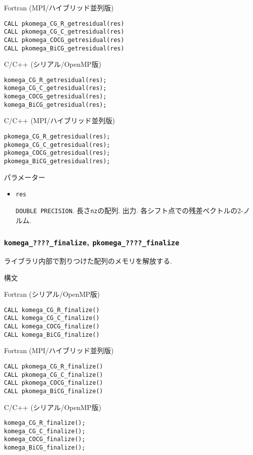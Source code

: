 \documentclass[12pt,titlepage]{jarticle}
\begin{document}
\noindent Fortran (MPI/ハイブリッド並列版)
\begin{verbatim}
CALL pkomega_CG_R_getresidual(res)
CALL pkomega_CG_C_getresidual(res)
CALL pkomega_COCG_getresidual(res)
CALL pkomega_BiCG_getresidual(res)
\end{verbatim}

\noindent C/C++ (シリアル/OpenMP版)
\begin{verbatim}
komega_CG_R_getresidual(res);
komega_CG_C_getresidual(res);
komega_COCG_getresidual(res);
komega_BiCG_getresidual(res);
\end{verbatim}

\noindent C/C++ (MPI/ハイブリッド並列版)
\begin{verbatim}
pkomega_CG_R_getresidual(res);
pkomega_CG_C_getresidual(res);
pkomega_COCG_getresidual(res);
pkomega_BiCG_getresidual(res);
\end{verbatim}

\noindent パラメーター

\begin{itemize}
  
\item \verb|res|

  \verb|DOUBLE PRECISION|.
  長さ\verb|nz|の配列. 出力.
  各シフト点での残差ベクトルの2-ノルム.

\end{itemize}

\subsubsection{\texttt{komega\_????\_finalize}, \texttt{pkomega\_????\_finalize}}

ライブラリ内部で割りつけた配列のメモリを解放する.

\noindent 構文

\noindent Fortran (シリアル/OpenMP版)
\begin{verbatim}
CALL komega_CG_R_finalize()
CALL komega_CG_C_finalize()
CALL komega_COCG_finalize()
CALL komega_BiCG_finalize()
\end{verbatim}

\noindent Fortran (MPI/ハイブリッド並列版)
\begin{verbatim}
CALL pkomega_CG_R_finalize()
CALL pkomega_CG_C_finalize()
CALL pkomega_COCG_finalize()
CALL pkomega_BiCG_finalize()
\end{verbatim}

\noindent C/C++ (シリアル/OpenMP版)
\begin{verbatim}
komega_CG_R_finalize();
komega_CG_C_finalize();
komega_COCG_finalize();
komega_BiCG_finalize();
\end{verbatim}
\end{document}
